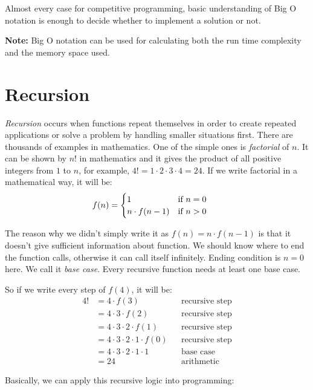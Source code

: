 \documentclass[12pt]{article}
\begin{document}
Almost every case for competitive programming, basic understanding of Big O notation is enough to decide whether to implement a solution or not.

\textbf{Note:} Big O notation can be used for calculating both the run time complexity and the memory space used.

\section{Recursion}

\emph{Recursion} occurs when functions repeat themselves in order to create repeated applications or solve a problem by handling smaller situations first. There are thousands of examples in mathematics. One of the simple ones is \emph{factorial} of $n$. It can be shown by $n!$ in mathematics and it gives the product of all positive integers from $1$ to $n$, for example, $4! = 1\cdot 2\cdot 3\cdot 4 = 24$. If we write factorial in a mathematical way, it will be:
\begin{align*}
    f(n) &= \begin{cases}
    1 & \text{if $n = 0$\,\, } \\
    n\cdot f(n - 1) & \text{if $n > 0$\,\,}
    \end{cases}
\end{align*}

The reason why we didn't simply write it as $f(n) = n \cdot f(n-1)$ is that it doesn't give sufficient information about function. We should know where to end the function calls, otherwise it can call itself infinitely. Ending condition is $n = 0$ here. We call it \emph{base case}. Every recursive function needs at least one base case.

So if we write every step of $f(4)$, it will be:
\begin{align*}
    4!
    &= 4\cdot f(3) && \text{recursive step} \\
    &= 4\cdot 3\cdot f(2) && \text{recursive step} \\
    &= 4\cdot 3\cdot 2\cdot f(1) && \text{recursive step} \\
    &= 4\cdot 3\cdot 2\cdot 1\cdot f(0) && \text{recursive step} \\
    &= 4\cdot 3\cdot 2\cdot 1\cdot 1 && \text{base case} \\
    &= 24 && \text{arithmetic}
\end{align*}

\cleardoublepage
Basically, we can apply this recursive logic into programming:
\end{document}

